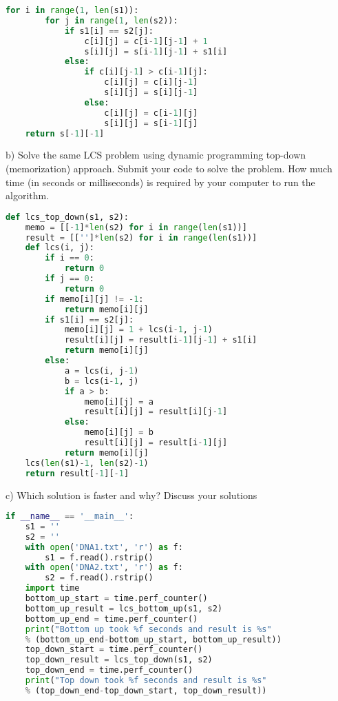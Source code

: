\documentclass[12pt]{article}
\newenvironment{problem}[2][Problem]{\begin{trivlist}
\item[\hskip \labelsep {\bfseries #1}\hskip \labelsep {\bfseries #2.}]}{\end{trivlist}}
\begin{document}
\begin{problem}{1}
\begin{lstlisting}[language=Python, caption=Find LCS Bottom Up]
    for i in range(1, len(s1)):
        for j in range(1, len(s2)):
            if s1[i] == s2[j]:
                c[i][j] = c[i-1][j-1] + 1
                s[i][j] = s[i-1][j-1] + s1[i]
            else:
                if c[i][j-1] > c[i-1][j]:
                    c[i][j] = c[i][j-1]
                    s[i][j] = s[i][j-1]
                else:
                    c[i][j] = c[i-1][j]
                    s[i][j] = s[i-1][j]
    return s[-1][-1]
\end{lstlisting}
\pagebreak
b) Solve the same LCS problem using dynamic programming top-down (memorization)
approach. Submit your code to solve the problem. How much time (in seconds or
milliseconds) is required by your computer to run the algorithm.
\begin{lstlisting}[language=Python, caption=Find LCS Top Down]
def lcs_top_down(s1, s2):
    memo = [[-1]*len(s2) for i in range(len(s1))]
    result = [['']*len(s2) for i in range(len(s1))]
    def lcs(i, j):
        if i == 0:
            return 0
        if j == 0:
            return 0
        if memo[i][j] != -1:
            return memo[i][j]
        if s1[i] == s2[j]:
            memo[i][j] = 1 + lcs(i-1, j-1)
            result[i][j] = result[i-1][j-1] + s1[i]
            return memo[i][j]
        else:
            a = lcs(i, j-1)
            b = lcs(i-1, j)
            if a > b:
                memo[i][j] = a
                result[i][j] = result[i][j-1]
            else:
                memo[i][j] = b
                result[i][j] = result[i-1][j]
            return memo[i][j]
    lcs(len(s1)-1, len(s2)-1)
    return result[-1][-1]
\end{lstlisting}
c) Which solution is faster and why? Discuss your solutions
\begin{lstlisting}[language=Python, caption=main function code]
if __name__ == '__main__':
    s1 = ''
    s2 = ''
    with open('DNA1.txt', 'r') as f:
        s1 = f.read().rstrip()
    with open('DNA2.txt', 'r') as f:
        s2 = f.read().rstrip()
    import time
    bottom_up_start = time.perf_counter()
    bottom_up_result = lcs_bottom_up(s1, s2)
    bottom_up_end = time.perf_counter()
    print("Bottom up took %f seconds and result is %s"
    % (bottom_up_end-bottom_up_start, bottom_up_result))
    top_down_start = time.perf_counter()
    top_down_result = lcs_top_down(s1, s2)
    top_down_end = time.perf_counter()
    print("Top down took %f seconds and result is %s"
    % (top_down_end-top_down_start, top_down_result))
\end{lstlisting}


\end{problem}
\end{document}

